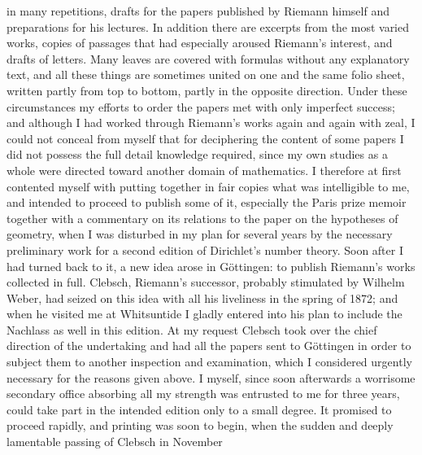\documentclass[11pt]{article}
\newcommand{\origpage}[1]{\par\vspace{0.25em}\noindent{\footnotesize\itshape [Printed page #1]}\par\vspace{0.25em}}
\begin{document}
\origpage{422}
in many repetitions, drafts for the papers published by Riemann himself and preparations for his lectures. In addition there are excerpts from the most varied works, copies of passages that had especially aroused Riemann's interest, and drafts of letters. Many leaves are covered with formulas without any explanatory text, and all these things are sometimes united on one and the same folio sheet, written partly from top to bottom, partly in the opposite direction. Under these circumstances my efforts to order the papers met with only imperfect success; and although I had worked through Riemann's works again and again with zeal, I could not conceal from myself that for deciphering the content of some papers I did not possess the full detail knowledge required, since my own studies as a whole were directed toward another domain of mathematics. I therefore at first contented myself with putting together in fair copies what was intelligible to me, and intended to proceed to publish some of it, especially the Paris prize memoir together with a commentary on its relations to the paper on the hypotheses of geometry, when I was disturbed in my plan for several years by the necessary preliminary work for a second edition of Dirichlet's number theory. Soon after I had turned back to it, a new idea arose in Göttingen: to publish Riemann's works collected in full. Clebsch, Riemann's successor, probably stimulated by Wilhelm Weber, had seized on this idea with all his liveliness in the spring of 1872; and when he visited me at Whitsuntide I gladly entered into his plan to include the Nachlass as well in this edition. At my request Clebsch took over the chief direction of the undertaking and had all the papers sent to Göttingen in order to subject them to another inspection and examination, which I considered urgently necessary for the reasons given above. I myself, since soon afterwards a worrisome secondary office absorbing all my strength was entrusted to me for three years, could take part in the intended edition only to a small degree. It promised to proceed rapidly, and printing was soon to begin, when the sudden and deeply lamentable passing of Clebsch in November
\end{document}

